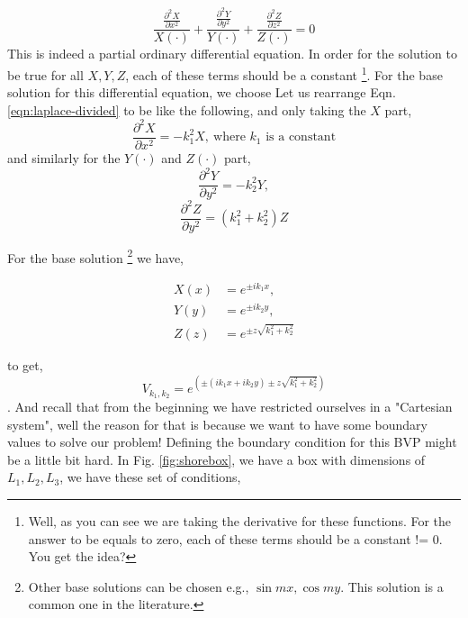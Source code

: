 \documentclass{tufte-book}
\begin{document}
\begin{equation}
\label{eqn:laplace-divided}
\frac{\frac{\partial^2 X}{\partial x^2}}{X(\cdot)} + \frac{\frac{\partial^2 Y}{\partial y^2}}{Y(\cdot)} + \frac{\frac{\partial^2 Z}{\partial z^2}}{Z(\cdot)} = 0
\end{equation}
 This is indeed a partial ordinary differential equation. In order for the solution to be true for all \(X, Y, Z\), each of these terms should be a constant \footnote{Well, as you can see we are taking the derivative for these functions. For the answer to be equals to zero, each of these terms should be a constant != 0. You get the idea?}. For the base solution for this differential equation, we choose 
 Let us rearrange Eqn. \eqref{eqn:laplace-divided} to be like the following, and only taking the \(X\)
part,
\begin{equation}
	\label{eqn:deriving-laplace-x-part}
	\frac{\partial^2 X}{\partial x^2} = -k_1^2 X,\   \text{where $k_1$ is a constant}
\end{equation}
and similarly for the $Y(\cdot)$ and $Z(\cdot)$ part,
\begin{equation}
\label{eqn:deriving-laplace-y-part}
\frac{\partial^2 Y}{\partial y^2} = -k_2^2 Y,
\end{equation}
\begin{equation}
\frac{\partial^2 Z}{\partial y^2} = (k_1^2+k_2^2) Z
\end{equation}

For the base solution \footnote{Other base solutions can be chosen e.g., \(\sin mx, \cos my\). This solution is a common one in the literature. } we have,

\begin{eqnarray}
\label{eqn:base-solution}
X(x) &= e^{\pm ik_1 x},\\
Y(y) &= e^{\pm ik_2 y},\\
Z(z) &= e^{\pm z\sqrt{k_1^2 + k_2^2}}
\end{eqnarray}

to get,
\begin{equation}
V_{k_1, k_2} = e^{\left(\pm (ik_1 x + i k_2 y) \pm z \sqrt{k_1^2 + k_2^2}\right)}
\end{equation}.
And recall that from the beginning we have restricted ourselves in a "Cartesian system", well the reason for that is because we want to have some boundary values to solve our problem! Defining the boundary condition for this BVP might be a little bit hard. In Fig. \ref{fig:shorebox}, we have a box with dimensions of $L_1 ,L_2, L_3$, we have these set of conditions,
\end{document}
